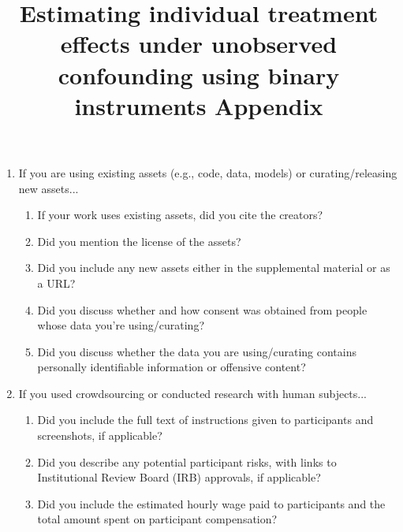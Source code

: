 \documentclass[nonatbib]{article}
\theoremstyle{definition}
\theoremstyle{plain}
\begin{document}
\begin{enumerate}
\item If you are using existing assets (e.g., code, data, models) or curating/releasing new assets...
\begin{enumerate}
  \item If your work uses existing assets, did you cite the creators?
  \item Did you mention the license of the assets?
  \item Did you include any new assets either in the supplemental material or as a URL?
  \item Did you discuss whether and how consent was obtained from people whose data you're using/curating?
  \item Did you discuss whether the data you are using/curating contains personally identifiable information or offensive content?
\end{enumerate}


\item If you used crowdsourcing or conducted research with human subjects...
\begin{enumerate}
  \item Did you include the full text of instructions given to participants and screenshots, if applicable?
  \item Did you describe any potential participant risks, with links to Institutional Review Board (IRB) approvals, if applicable?
  \item Did you include the estimated hourly wage paid to participants and the total amount spent on participant compensation?
\end{enumerate}


\end{enumerate}


\clearpage
\title{Estimating individual treatment effects under unobserved confounding using binary instruments Appendix}
\maketitle
\end{document}
